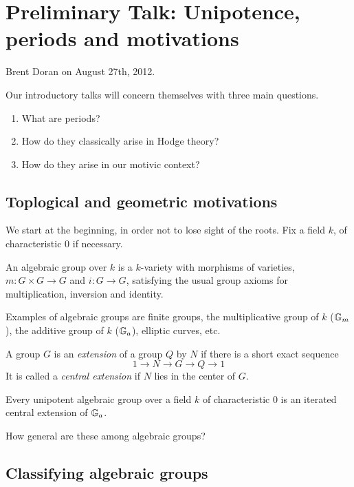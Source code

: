 \chapter*{Preliminary Talk: Unipotence, periods and motivations}

Brent Doran on August 27th, 2012.

Our introductory talks will concern themselves with three main questions.
\begin{enumerate}
\item What are periods?
\item How do they classically arise in Hodge theory?
\item How do they arise in our motivic context?
\end{enumerate}

\section{Toplogical and geometric motivations}

We start at the beginning, in order not to lose sight of the roots. Fix a field $k$, of characteristic 0 if necessary.

\begin{defn}
An algebraic group over $k$ is a $k$-variety with morphisms of varieties, $m : G \times G \to G$ and $i : G \to G$, satisfying the usual group axioms for multiplication, inversion and identity.
\end{defn}
\begin{exam}
Examples of algebraic groups are finite groups, the multiplicative group of $k$ ($\mathbb{G}_m$), the additive group of $k$ ($\mathbb{G}_a$), elliptic curves, etc.
\end{exam}
\begin{defn}
A group $G$ is an \emph{extension} of a group $Q$ by $N$ if there is a short exact sequence
\[
1 \to N \to G \to Q \to 1
\]
It is called a \emph{central extension} if $N$ lies in the center of $G$.
\end{defn}

\begin{prop}
Every unipotent algebraic group over a field $k$ of characteristic 0 is an iterated central extension of $\mathbb{G}_a$.
\end{prop}
\noindent How general are these among algebraic groups?

\section{Classifying algebraic groups}

